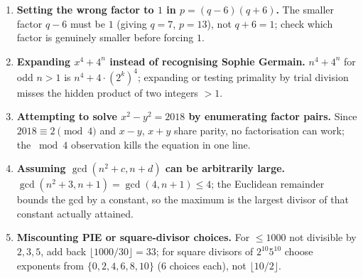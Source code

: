 \documentclass[11pt,a4paper]{article}
\begin{document}
\begin{enumerate}[leftmargin=2em, itemsep=4pt]
  \item \textbf{Setting the wrong factor to $1$ in $p=(q-6)(q+6)$.}
        The smaller factor $q-6$ must be $1$ (giving $q=7$, $p=13$), not $q+6=1$; check which factor is genuinely smaller before forcing $1$. 
  \item \textbf{Expanding $x^{4}+4^{n}$ instead of recognising Sophie Germain.}
        $n^{4}+4^{n}$ for odd $n>1$ is $n^{4}+4\cdot(2^{k})^{4}$; expanding or testing primality by trial division misses the hidden product of two integers $>1$. 
  \item \textbf{Attempting to solve $x^{2}-y^{2}=2018$ by enumerating factor pairs.}
        Since $2018\equiv2\pmod4$ and $x-y$, $x+y$ share parity, no factorisation can work; the $\bmod4$ observation kills the equation in one line. 
  \item \textbf{Assuming $\gcd(n^{2}+c,n+d)$ can be arbitrarily large.}
        $\gcd(n^{2}+3,n+1)=\gcd(4,n+1)\le4$; the Euclidean remainder bounds the gcd by a constant, so the maximum is the largest divisor of that constant actually attained. 
  \item \textbf{Miscounting PIE or square-divisor choices.}
        For $\le1000$ not divisible by $2,3,5$, add back $\lfloor1000/30\rfloor=33$; for square divisors of $2^{10}5^{10}$ choose exponents from $\{0,2,4,6,8,10\}$ ($6$ choices each), not $\lfloor10/2\rfloor$. 
\end{enumerate}

\end{document}
